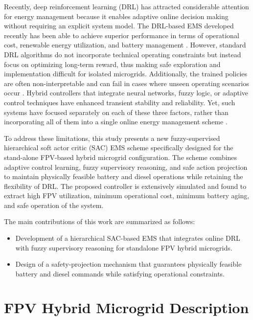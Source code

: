 \documentclass[journal]{IEEEtran}
\begin{document}
Recently, deep reinforcement learning (DRL) has attracted considerable attention for energy management because it enables adaptive online decision making without requiring an explicit system model. The DRL-based EMS developed recently has been able to achieve superior performance in terms of operational cost, renewable energy utilization, and battery management \cite{Ji2019,Guo2021,Meng2025}. However, standard DRL algorithms do not incorporate technical operating constraints but instead focus on optimizing long-term reward, thus making safe exploration and implementation difficult for isolated microgrids. Additionally, the trained policies are often non-interpretable and can fail in cases where unseen operating scenarios occur \cite{Garcia2015,Meng2025}. Hybrid controllers that integrate neural networks, fuzzy logic, or adaptive control techniques have enhanced transient stability and reliability. Yet, such systems have focused separately on each of these three factors, rather than incorporating all of them into a single online energy management scheme \cite{Aghmadi2025,Rajput2025,Adiche2024,Annamraju2021}.

To address these limitations, this study presents a new fuzzy-supervised hierarchical soft actor critic (SAC) EMS scheme specifically designed for the stand-alone FPV-based hybrid microgrid configuration. The scheme combines adaptive control learning, fuzzy supervisory reasoning, and safe action projection to maintain physically feasible battery and diesel operations while retaining the flexibility of DRL. The proposed controller is extensively simulated and found to extract high FPV utilization, minimum operational cost, minimum battery aging, and safe operation of the system.

The main contributions of this work are summarized as follows:

\begin{itemize}
\item Development of a hierarchical SAC-based EMS that integrates online DRL with fuzzy supervisory reasoning for standalone FPV hybrid microgrids.

\item Design of a safety-projection mechanism that guarantees physically feasible battery and diesel commands while satisfying operational constraints.
\end{itemize}


\section{FPV Hybrid Microgrid Description}
\end{document}
